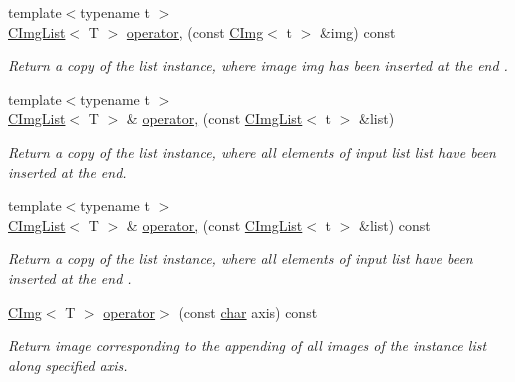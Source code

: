 \begin{Indent}
\begin{DoxyCompactItemize}
{\footnotesize template$<$typename t $>$ }\\\hyperlink{structcimg__library__suffixed_1_1CImgList}{C\+Img\+List}$<$ T $>$ \hyperlink{structcimg__library__suffixed_1_1CImgList_aa242710152fceb05fa4099a2b68240ad}{operator,} (const \hyperlink{structcimg__library__suffixed_1_1CImg}{C\+Img}$<$ t $>$ \&img) const
\begin{DoxyCompactList}\small\item\em Return a copy of the list instance, where image {\ttfamily img} has been inserted at the end . \end{DoxyCompactList}\item 
{\footnotesize template$<$typename t $>$ }\\\hyperlink{structcimg__library__suffixed_1_1CImgList}{C\+Img\+List}$<$ T $>$ \& \hyperlink{structcimg__library__suffixed_1_1CImgList_ad6ba5284d68a09c1164e49eb638f7e45}{operator,} (const \hyperlink{structcimg__library__suffixed_1_1CImgList}{C\+Img\+List}$<$ t $>$ \&list)
\begin{DoxyCompactList}\small\item\em Return a copy of the list instance, where all elements of input list {\ttfamily list} have been inserted at the end. \end{DoxyCompactList}\item 
\mbox{\label{structcimg__library__suffixed_1_1CImgList_a0e264965791f676a8888b48a18878647}} 
{\footnotesize template$<$typename t $>$ }\\\hyperlink{structcimg__library__suffixed_1_1CImgList}{C\+Img\+List}$<$ T $>$ \& \hyperlink{structcimg__library__suffixed_1_1CImgList_a0e264965791f676a8888b48a18878647}{operator,} (const \hyperlink{structcimg__library__suffixed_1_1CImgList}{C\+Img\+List}$<$ t $>$ \&list) const
\begin{DoxyCompactList}\small\item\em Return a copy of the list instance, where all elements of input {\ttfamily list} have been inserted at the end . \end{DoxyCompactList}\item 
\hyperlink{structcimg__library__suffixed_1_1CImg}{C\+Img}$<$ T $>$ \hyperlink{structcimg__library__suffixed_1_1CImgList_a0e99516c57bddf970731a26dee22ec64}{operator$>$} (const \hyperlink{classchar}{char} axis) const
\begin{DoxyCompactList}\small\item\em Return image corresponding to the appending of all images of the instance list along specified axis. \end{DoxyCompactList}\item 

\end{DoxyCompactItemize}
\end{Indent}

